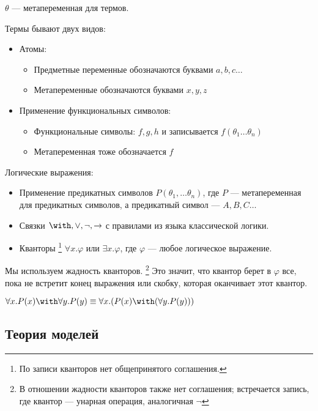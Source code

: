 \(\theta\) --- метапеременная для термов.

Термы бывают двух видов:
\begin{itemize}
    \item Атомы:
          \begin{itemize}
              \item Предметные переменные обозначаются буквами \(a,b,c \dots \)
              \item Метапеременные обозначаются буквами \(x,y,z\)
          \end{itemize}
    \item Применение функциональных символов:
          \begin{itemize}
              \item Функциональные символы: \(f,g,h\) и записывается \(f(\theta_1 \dots \theta_n)\)
              \item Метапеременная тоже обозначается \(f\)
          \end{itemize}
\end{itemize}

Логические выражения:
\begin{itemize}
    \item Применение предикатных символов \(P(\theta_1, \dots \theta_n)\), где \(P\) --- метапеременная для предикатных символов, а предикатный символ --- \(A, B, C \dots \)
    \item Связки \(\with, \lor, \neg, \to \) с правилами из языка классической логики.
    \item Кванторы \footnote{По записи кванторов нет общепринятого соглашения.} \(\forall x.\varphi\) или \(\exists x.\varphi\), где \(\varphi\) --- любое логическое выражение.
\end{itemize}

Мы используем жадность кванторов. \footnote{В отношении жадности кванторов также нет соглашения; встречается запись, где квантор --- унарная операция, аналогичная \(\neg\)} Это значит, что квантор берет в \(\varphi\) все, пока не встретит конец выражения или скобку, которая оканчивает этот квантор.

\begin{example}
    \(\forall x.P(x) \with \forall y.P(y) \equiv \forall x.(P(x) \with (\forall y.P(y)))\)
\end{example}

\subsection{Теория моделей}

